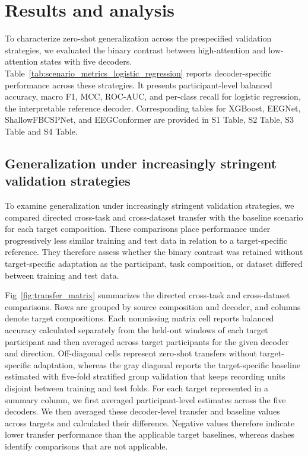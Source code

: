 \documentclass[10pt,letterpaper]{article}
\begin{document}
\section*{Results and analysis}

To characterize zero-shot generalization across the prespecified validation
strategies, we evaluated the binary contrast between high-attention and
low-attention states with five decoders.
Table~\ref{tab:scenario_metrics_logistic_regression} reports decoder-specific
performance across these strategies. It presents
participant-level balanced accuracy, macro F1, MCC, ROC-AUC, and per-class
recall for logistic regression, the interpretable reference decoder.
Corresponding tables for XGBoost, EEGNet, ShallowFBCSPNet, and EEGConformer are
provided in S1 Table, S2 Table, S3 Table and S4 Table.



\subsection*{Generalization under increasingly stringent validation strategies}

To examine generalization under increasingly stringent validation strategies,
we compared directed cross-task and cross-dataset transfer with the
baseline scenario for each target composition. These comparisons place
performance under progressively less similar training and test data in relation
to a target-specific reference. They therefore assess whether the binary
contrast was retained without target-specific adaptation as the participant,
task composition, or dataset differed between training and test data.

Fig~\ref{fig:transfer_matrix} summarizes the directed cross-task and
cross-dataset comparisons. Rows are grouped by source composition and decoder,
and columns denote target compositions. Each nonmissing matrix cell reports
balanced accuracy calculated separately from the held-out windows of each
target participant and then averaged across target participants for the given
decoder and direction. Off-diagonal cells represent zero-shot transfers without
target-specific adaptation, whereas the gray diagonal reports the
target-specific baseline estimated with five-fold stratified group validation
that keeps recording units disjoint between training and test folds. For each
target represented in a summary column, we first averaged participant-level
estimates across the five decoders. We then averaged these decoder-level
transfer and baseline values across targets and calculated their difference.
Negative values therefore indicate lower transfer performance than the
applicable target baselines, whereas dashes identify comparisons that are not
applicable.
\end{document}
